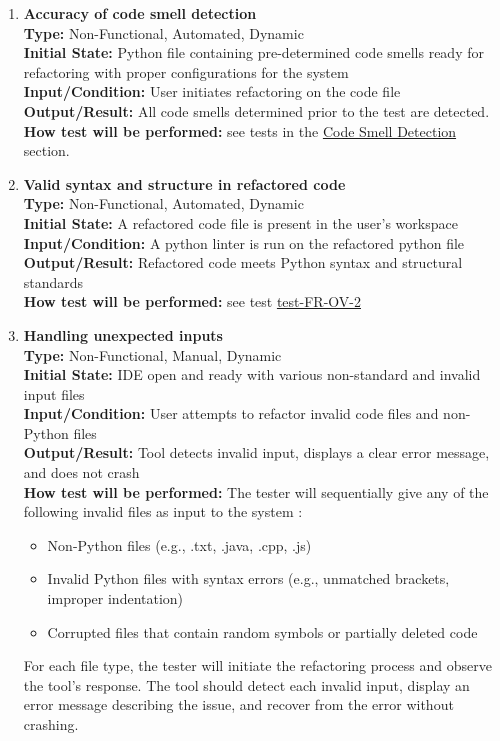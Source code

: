 \documentclass[12pt, titlepage]{article}
\begin{document}
\begin{enumerate}[label={\bf \textcolor{Maroon}{test-PF-\arabic*}}, wide=0pt, font=\itshape]
  \item \textbf{Accuracy of code smell detection} \\[2mm]
    \textbf{Type:} Non-Functional, Automated, Dynamic \\
    \textbf{Initial State:} Python file containing pre-determined code smells ready for refactoring with proper configurations for the system \\
    \textbf{Input/Condition:} User initiates refactoring on the code file \\
    \textbf{Output/Result:} All code smells determined prior to the test are detected. \\[2mm]
    \textbf{How test will be performed:} see tests in the \hyperref[4.1.2]{Code Smell Detection} section.

  \item \textbf{Valid syntax and structure in refactored code} \\[2mm]
    \textbf{Type:} Non-Functional, Automated, Dynamic \\
    \textbf{Initial State:} A refactored code file is present in the user's workspace \\
    \textbf{Input/Condition:} A python linter is run on the refactored python file \\
    \textbf{Output/Result:} Refactored code meets Python syntax and structural standards \\[2mm]
    \textbf{How test will be performed:} see test \hyperref[itm:FR-OV-2]{test-FR-OV-2}

  \item \textbf{Handling unexpected inputs} \\[2mm]
    \textbf{Type:} Non-Functional, Manual, Dynamic \\
    \textbf{Initial State:} IDE open and ready with various non-standard and invalid input files \\
    \textbf{Input/Condition:} User attempts to refactor invalid code files and non-Python files \\
    \textbf{Output/Result:} Tool detects invalid input, displays a clear error message, and does not crash \\[2mm]
    \textbf{How test will be performed:} The tester will sequentially give any of the following invalid files as input to the system :
    \begin{itemize}
        \item Non-Python files (e.g., .txt, .java, .cpp, .js)
        \item Invalid Python files with syntax errors (e.g., unmatched brackets, improper indentation)
        \item Corrupted files that contain random symbols or partially deleted code
    \end{itemize}
    For each file type, the tester will initiate the refactoring process and observe the tool's response. The tool should detect each invalid input, display an error message describing the issue, and recover from the error without crashing. 


\end{enumerate}
\end{document}
